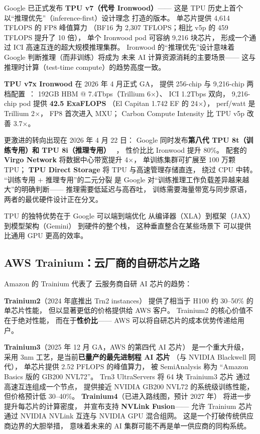Google 已正式发布 \textbf{TPU v7（代号 Ironwood）}——
这是 TPU 历史上首个以“推理优先”（inference-first）设计理念
打造的版本。
单芯片提供 4,614 TFLOPS 的 FP8 峰值算力
（BF16 为 2,307 TFLOPS；相比 v5p 的 459 TFLOPS 提升了 10 倍），
单个 Ironwood pod 可容纳 9,216 块芯片，
形成一个通过 ICI 高速互连的超大规模推理集群。
Ironwood 的“推理优先”设计意味着
Google 判断推理（而非训练）将成为
未来 AI 计算资源消耗的主要场景——
这与推理时计算（test-time compute）的趋势高度一致。

\textbf{TPU v7x Ironwood} 在 2026 年 4 月正式 GA，
提供 256-chip 与 9,216-chip 两档配置~\cite{google_tpu_ironwood_2026}：
192GB HBM @ 7.4Tbps（Trillium 6$\times$）、
ICI 1.2Tbps 双向，
9,216-chip pod 提供 \textbf{42.5 ExaFLOPS}
（El Capitan 1.742 EF 的 24$\times$），
perf/watt 是 Trillium 2$\times$，
FP8 首次进入 MXU；
Carbon Compute Intensity 比 TPU v5p 改善 3.7$\times$。

更激进的转向出现在 2026 年 4 月 22 日：
Google 同时发布\textbf{第八代 TPU 8t（训练专用）和 TPU 8i（推理专用）}%
~\cite{google_tpu_8t_8i_2026}，
性价比比 Ironwood 提升 80\%。
配套的 \textbf{Virgo Network} 将数据中心带宽提升 4$\times$，
单训练集群可扩展至 100 万颗 TPU；
\textbf{TPU Direct Storage} 将 TPU 与高速管理存储直连，
绕过 CPU 中转。
“训练专用 + 推理专用”的二元分裂
是 Google 对“训练推理工作负载差异越来越大”的明确判断——
推理需要低延迟与高吞吐，
训练需要海量带宽与同步原语，
两者的最优硬件设计正在分叉。

TPU 的独特优势在于
Google 可以端到端优化
从编译器（XLA）到框架（JAX）到模型架构（Gemini）
到硬件的整个栈，
这种垂直整合在某些场景下
可以提供比通用 GPU 更高的效率。

\subsection{AWS Trainium：云厂商的自研芯片之路}

Amazon 的 Trainium 代表了
云服务商自研 AI 芯片的趋势：

\textbf{Trainium2}（2024 年底推出 Trn2 instances）
提供了相当于 H100 约 30--50\% 的单芯片性能，
但以显著更低的价格提供给 AWS 客户。
Trainium2 的核心价值不在于绝对性能，
而在于\textbf{性价比}——
AWS 可以将自研芯片的成本优势传递给用户。

\textbf{Trainium3}（2025 年 12 月 GA，AWS 的第四代 AI 芯片）
是一个重大升级，
采用 3nm 工艺，是当前\textbf{已量产的最先进制程 AI 芯片}
（与 NVIDIA Blackwell 同代），
单芯片提供 2.52 PFLOPS 的峰值算力，
被 SemiAnalysis 称为
“Amazon Basics 版的 GB200 NVL72”。
Trn3 UltraServers 将 64 块 Trainium3 芯片
通过高速互连组成一个节点，
提供接近 NVIDIA GB200 NVL72 的系统级训练性能，
但价格预计低 30--40\%。
\textbf{Trainium4}（已进入路线图，预计 2027 年）
将进一步提升每芯片的计算密度，
并宣布支持 \textbf{NVLink Fusion}——
允许 Trainium 芯片通过 NVIDIA NVLink 互连与 NVIDIA GPU 混合组网。
这是一个打破传统供应商边界的大胆举措，
意味着未来的 AI 集群可能不再是单一供应商的同构系统。

